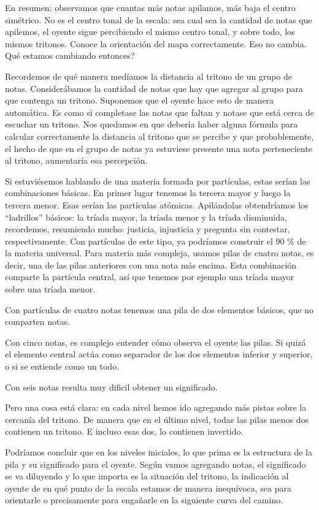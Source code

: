 \documentclass[]{report}
\begin{document}
  En resumen: observamos que cuantas más notas apilamos, más baja el centro simétrico. No es el centro tonal de la escala: sea cual sea la cantidad de notas que apilemos, el oyente sigue percibiendo el mismo centro tonal, y sobre todo, los mismos tritonos. Conoce la orientación del mapa correctamente. Eso no cambia. Qué estamos cambiando entonces?
  
  Recordemos de qué manera medíamos la distancia al tritono de un grupo de notas. Considerábamos la cantidad de notas que hay que agregar al grupo para que contenga un tritono. Suponemos que el oyente hace esto de manera automática. Es como si completase las notas que faltan y notase que está cerca de escuchar un tritono. Nos quedamos en que debería haber alguna fórmula para calcular correctamente la distancia al tritono que se percibe y que probablemente, el hecho de que en el grupo de notas ya estuviese presente una nota perteneciente al tritono, aumentaría esa percepción.
   
  Si estuviésemos hablando de una materia formada por partículas, estas serían las combinaciones básicas. En primer lugar tenemos la tercera mayor y luego la tercera menor. Esas serían las partículas atómicas. Apilándolas obtendríamos los ``ladrillos'' básicos: la tríada mayor, la tríada menor y la tríada disminuida, recordemos, resumiendo mucho: justicia, injusticia y pregunta sin contestar, respectivamente. Con partículas de este tipo, ya podríamos construir el 90 \% de la materia universal. Para materia más compleja, usamos pilas de cuatro notas, es decir, una de las pilas anteriores con una nota más encima. Esta combinación comparte la partícula central, así que tenemos por ejemplo una tríada mayor sobre una tríada menor.
  
  Con partículas de cuatro notas tenemos una pila de dos elementos básicos, que no comparten notas.
  
  Con cinco notas, es complejo entender cómo observa el oyente las pilas. Si quizá el elemento central actúa como separador de los dos elementos inferior y superior, o si se entiende como un todo.
  
  Con seis notas resulta muy dificil obtener un significado.
  
  Pero una cosa está clara: en cada nivel hemos ido agregando más pistas sobre la cercanía del tritono. De manera que en el último nivel, todas las pilas menos dos contienen un tritono. E incluso esas dos, lo contienen invertido.
  
  Podríamos concluir que en los niveles iniciales, lo que prima es la estructura de la pila y su significado para el oyente. Según vamos agregando notas, el significado se va diluyendo y lo que importa es la situación del tritono, la indicación al oyente de en qué punto de la escala estamos de manera inequívoca, sea para orientarle o precisamente para engañarle en la siguiente curva del camino.
  
\end{document}
